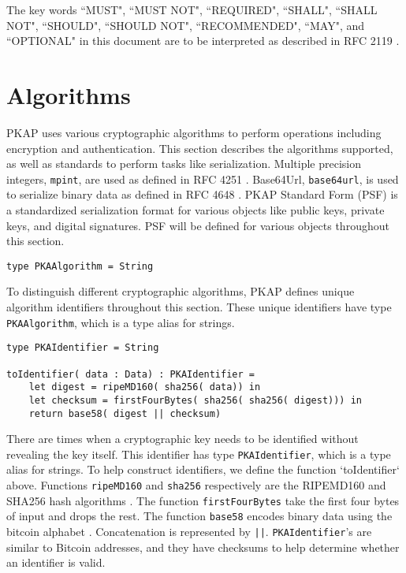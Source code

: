 \documentclass{article}
\newcommand{\pkap}{PKAP}
\begin{document}
The key words ``MUST", ``MUST NOT", ``REQUIRED", ``SHALL", ``SHALL NOT", ``SHOULD", ``SHOULD NOT", ``RECOMMENDED", ``MAY", and ``OPTIONAL" in this document are to be interpreted as described in RFC 2119 \cite{rfc2119}. 

\section{Algorithms}
\label{sec:algorithms}

\pkap{} uses various cryptographic algorithms to perform operations including encryption and authentication. 
This section describes the algorithms supported, as well as standards to perform tasks like serialization. 
Multiple precision integers, \texttt{mpint}, are used as defined in RFC 4251 \cite{rfc4251}. %
Base64Url, \texttt{base64url}, is used to serialize binary data as defined in RFC 4648 \cite{rfc4648}.  %
\pkap{} Standard Form (PSF) is a standardized serialization format for various objects like public keys, private keys, and digital signatures. 
PSF will be defined for various objects throughout this section. 

\begin{lstlisting}
type PKAAlgorithm = String
\end{lstlisting}

To distinguish different cryptographic algorithms, \pkap{} defines unique algorithm identifiers throughout this section. 
These unique identifiers have type \texttt{PKAAlgorithm}, which is a type alias for strings. 

\begin{lstlisting}
type PKAIdentifier = String

toIdentifier( data : Data) : PKAIdentifier = 
    let digest = ripeMD160( sha256( data)) in
    let checksum = firstFourBytes( sha256( sha256( digest))) in
    return base58( digest || checksum)
\end{lstlisting}

There are times when a cryptographic key needs to be identified without revealing the key itself. 
This identifier has type \texttt{PKAIdentifier}, which is a type alias for strings. 
To help construct identifiers, we define the function `toIdentifier` above. 
Functions \texttt{ripeMD160} and \texttt{sha256} respectively are the RIPEMD160 and SHA256 hash algorithms \cite{ripemd160, rfc4634}. 
The function \texttt{firstFourBytes} take the first four bytes of input and drops the rest. 
The function \texttt{base58} encodes binary data using the bitcoin alphabet \cite{base58}. 
Concatenation is represented by \texttt{||}. 
\texttt{PKAIdentifier}'s are similar to Bitcoin addresses, and they have checksums to help determine whether an identifier is valid. %
\end{document}
